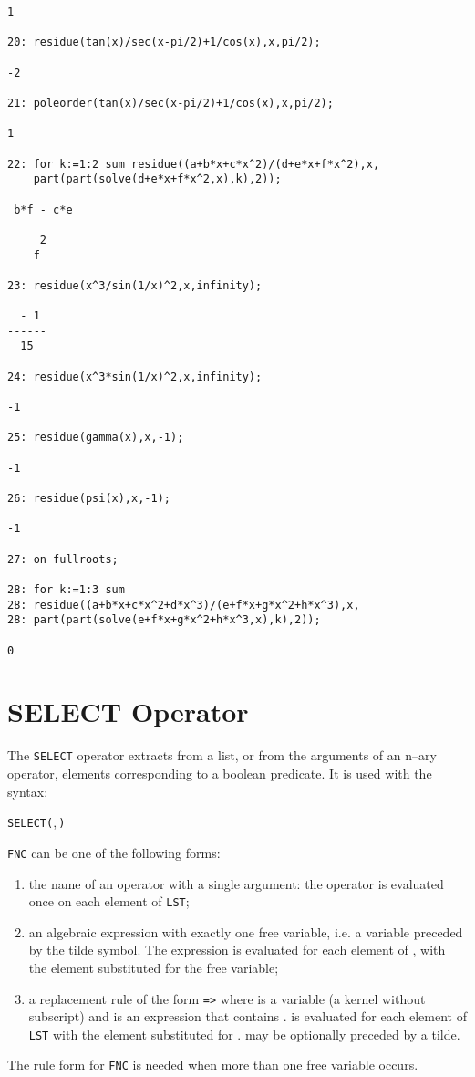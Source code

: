 \begin{verbatim}
1

20: residue(tan(x)/sec(x-pi/2)+1/cos(x),x,pi/2);

-2

21: poleorder(tan(x)/sec(x-pi/2)+1/cos(x),x,pi/2);

1

22: for k:=1:2 sum residue((a+b*x+c*x^2)/(d+e*x+f*x^2),x,
    part(part(solve(d+e*x+f*x^2,x),k),2));

 b*f - c*e
-----------
     2
    f

23: residue(x^3/sin(1/x)^2,x,infinity);

  - 1
------
  15

24: residue(x^3*sin(1/x)^2,x,infinity);

-1

25: residue(gamma(x),x,-1);

-1

26: residue(psi(x),x,-1);

-1

27: on fullroots;

28: for k:=1:3 sum
28: residue((a+b*x+c*x^2+d*x^3)/(e+f*x+g*x^2+h*x^3),x,
28: part(part(solve(e+f*x+g*x^2+h*x^3,x),k),2));

0
\end{verbatim}


\section{SELECT Operator}
\hypertarget{operator:SELECT}{}

The \texttt{SELECT} operator extracts from a list,
or from the arguments of an n--ary operator, elements corresponding
to a boolean predicate. It is used with the syntax:
\begin{syntax}
  \texttt{SELECT(},\,\texttt{)}
\end{syntax}

\texttt{FNC} can be one of the following forms:
\begin{enumerate}
\item the name of an operator with a single argument: the operator
is evaluated once on each element of \texttt{LST};
\item an algebraic expression with exactly one free variable, i.e.
a variable preceded by the tilde symbol. The expression
is evaluated for each element of , with the element
substituted for the free variable;
\item a replacement rule of the form  \texttt{=>} 
where  is a variable (a kernel without subscript)
and  is an expression that contains .
 is evaluated for each element of \texttt{LST} with
the element substituted for  .  may be
optionally preceded by a tilde.
\end{enumerate}
The rule form  for \texttt{FNC} is needed when more than
one free variable occurs.


